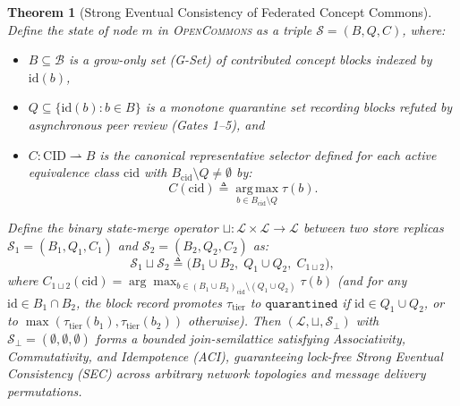 \documentclass[10pt,twocolumn]{article}
\newtheorem{theorem}{Theorem}
\begin{document}
\begin{theorem}[Strong Eventual Consistency of Federated Concept Commons]
\label{thm:crdt_sec}
Define the state of node $m$ in \textsc{OpenCommons} as a triple $\mathcal{S} = (B, Q, C)$, where:
\begin{itemize}
    \item $B \subseteq \mathcal{B}$ is a grow-only set (G-Set) of contributed concept blocks indexed by $\text{id}(b)$,
    \item $Q \subseteq \{\text{id}(b) : b \in B\}$ is a monotone quarantine set recording blocks refuted by asynchronous peer review (Gates 1--5), and
    \item $C: \text{CID} \rightharpoonup B$ is the canonical representative selector defined for each active equivalence class $\text{cid}$ with $B_{\text{cid}} \setminus Q \neq \emptyset$ by:
    \begin{equation}
        C(\text{cid}) \triangleq \operatorname*{arg\,max}_{b \in B_{\text{cid}} \setminus Q} \tau(b).
    \end{equation}
\end{itemize}
Define the binary state-merge operator $\sqcup: \mathcal{L} \times \mathcal{L} \to \mathcal{L}$ between two store replicas $\mathcal{S}_1 = (B_1, Q_1, C_1)$ and $\mathcal{S}_2 = (B_2, Q_2, C_2)$ as:
\begin{equation}
    \mathcal{S}_1 \sqcup \mathcal{S}_2 \triangleq \Big(B_1 \cup B_2,\; Q_1 \cup Q_2,\; C_{1 \sqcup 2}\Big),
    \label{eq:crdt_merge}
\end{equation}
where $C_{1 \sqcup 2}(\text{cid}) = \arg\max_{b \in (B_1 \cup B_2)_{\text{cid}} \setminus (Q_1 \cup Q_2)} \tau(b)$ (and for any $\text{id} \in B_1 \cap B_2$, the block record promotes $\tau_{\text{tier}}$ to $\texttt{quarantined}$ if $\text{id} \in Q_1 \cup Q_2$, or to $\max(\tau_{\text{tier}}(b_1), \tau_{\text{tier}}(b_2))$ otherwise). Then $(\mathcal{L}, \sqcup, \mathcal{S}_{\bot})$ with $\mathcal{S}_{\bot} = (\emptyset, \emptyset, \emptyset)$ forms a bounded join-semilattice satisfying Associativity, Commutativity, and Idempotence (ACI), guaranteeing lock-free Strong Eventual Consistency (SEC) across arbitrary network topologies and message delivery permutations.
\end{theorem}
\end{document}

